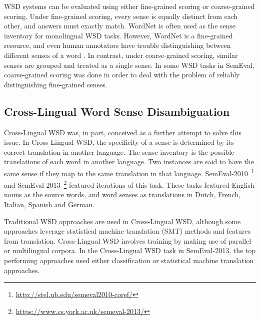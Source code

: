 WSD systems can be evaluated using either fine-grained scoring or
coarse-grained scoring. Under fine-grained scoring, every sense is
equally distinct from each other, and answers must exactly match. 
WordNet is often used as the sense inventory for monolingual WSD tasks. However, WordNet is a fine-grained resource, and even human annotators have
trouble distinguishing between different senses of a word
\cite{edmonds2002introduction}.  In contrast, under coarse-grained
scoring, similar senses are grouped and treated as a single sense.  In
some WSD tasks in SemEval, coarse-grained scoring was done in order
to deal with the problem of reliably distinguishing fine-grained
senses. 

\subsection{Cross-Lingual Word Sense Disambiguation}
Cross-Lingual WSD was, in part, conceived as a further attempt to
solve this issue. In Cross-Lingual WSD, the specificity of a sense is
determined by its correct translation in another language. The sense
inventory is the possible translations of each word in another
language. Two instances are said to have the same sense if they map to
the same translation in that language.
SemEval-2010~\cite{Lefever2010}\footnote{\url{http://stel.ub.edu/semeval2010-coref/}}
and SemEval-2013~\cite{Lefever2013}\footnote{\url{https://www.cs.york.ac.uk/semeval-2013/}}
featured iterations of this task. These tasks featured
English nouns as the source words, and word senses as translations in
Dutch, French, Italian, Spanish and German.

Traditional WSD approaches are used in Cross-Lingual WSD, although
some approaches leverage statistical machine translation (SMT) methods
and features from translation. Cross-Lingual WSD involves training by
making use of parallel or multilingual corpora. In the Cross-Lingual
WSD task in SemEval-2013, the top performing approaches used either
classification or statistical machine translation approaches.

